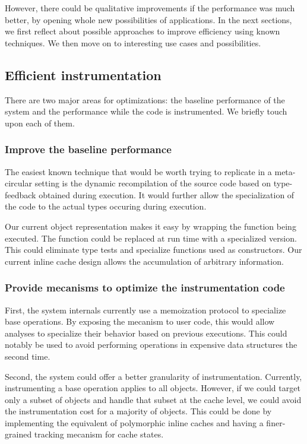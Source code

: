 However, there could be qualitative improvements if the performance was much
better, by opening whole new possibilities of applications.  In the next
sections, we first reflect about possible approaches to improve efficiency
using known techniques. We then move on to interesting use cases and
possibilities.

\subsection{Efficient instrumentation}

There are two major areas for optimizations: the baseline performance of the
system and the performance while the code is instrumented. We briefly touch
upon each of them. 

\subsubsection{Improve the baseline performance}

The easiest known technique that would be worth trying to replicate in a
meta-circular setting is the dynamic recompilation of the source code based on
type-feedback obtained during execution. It would further allow the
specialization of the code to the actual types occuring during execution.

Our current object representation makes it easy by wrapping the function being
executed.  The function could be replaced at run time with a specialized
version. This could eliminate type tests and specialize functions used as
constructors. Our current inline cache design allows the accumulation of
arbitrary information.

\subsubsection{Provide mecanisms to optimize the instrumentation code}

First, the system internals currently use a memoization protocol to specialize base
operations. By exposing the mecanism to user code, this would allow analyses to
specialize their behavior based on previous executions. This could notably be
used to avoid performing operations in expensive data structures the second
time.

Second, the system could offer a better granularity of instrumentation.
Currently, instrumenting a base operation applies to all objects. However, if
we could target only a subset of objects and handle that subset at the cache
level, we could avoid the instrumentation cost for a majority of objects. This
could be done by implementing the equivalent of polymorphic inline caches and
having a finer-grained tracking mecanism for cache states.


